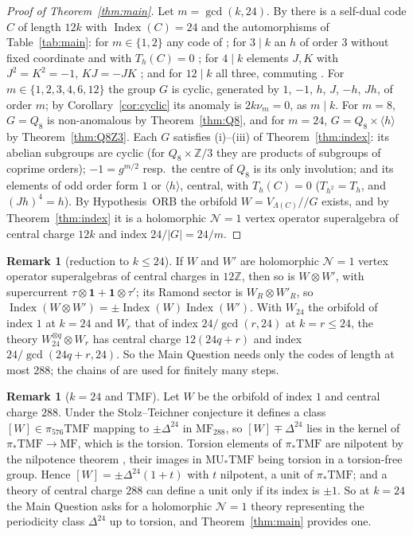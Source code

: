 \documentclass[11pt]{amsart}
\theoremstyle{definition}
\newtheorem{remark}[theorem]{Remark}
\newcommand{\Z}{\mathbb{Z}}
\newcommand{\cN}{\mathcal N}
\newcommand{\Index}{\operatorname{Index}}
\newcommand{\orb}{/\!\!/}
\begin{document}
\begin{proof}[Proof of Theorem~\ref{thm:main}]
Let $m=\gcd(k,24)$. By \cite[Thms.~B, C]{I} there is a self-dual code $C$ of length $12k$ with
$\Index(C)=24$ and the automorphisms of Table~\ref{tab:main}: for $m\in\{1,2\}$ any code of
\cite[Thm.~B]{I}; for $3\mid k$ an $h$ of order $3$ without fixed coordinate and with $T_h(C)=0$
\cite[Thm.~C(a)]{I}; for $4\mid k$ elements $J,K$ with $J^2=K^2=-1$, $KJ=-JK$ \cite[Thm.~C(b)]{I}; and
for $12\mid k$ all three, commuting \cite[Thm.~C(c)]{I}. For $m\in\{1,2,3,4,6,12\}$ the group $G$ is cyclic,
generated by $1$, $-1$, $h$, $J$, $-h$, $Jh$, of order $m$; by Corollary~\ref{cor:cyclic} its anomaly is
$2k\nu_m=0$, as $m\mid k$. For $m=8$, $G=Q_8$ is non-anomalous by Theorem~\ref{thm:Q8}, and for $m=24$,
$G=Q_8\times\langle h\rangle$ by Theorem~\ref{thm:Q8Z3}. Each $G$ satisfies (i)--(iii) of
Theorem~\ref{thm:index}: its abelian subgroups are cyclic (for $Q_8\times\Z/3$ they are products of
subgroups of coprime orders); $-1=g^{m/2}$ resp.\ the centre of $Q_8$ is its only involution; and its
elements of odd order form $1$ or $\langle h\rangle$, central, with $T_h(C)=0$ ($T_{h^2}=T_h$, and
$(Jh)^4=h$). By Hypothesis~ORB the orbifold $W=V_{\Lambda(C)}\orb G$ exists, and by
Theorem~\ref{thm:index} it is a holomorphic $\cN=1$ vertex operator superalgebra of central charge
$12k$ and index $24/|G|=24/m$.
\end{proof}

\begin{remark}[reduction to $k\le24$]\label{rem:reduction}
If $W$ and $W'$ are holomorphic $\cN=1$ vertex operator superalgebras of central charges in $12\Z$, then
so is $W\otimes W'$, with supercurrent $\tau\otimes\mathbf 1+\mathbf 1\otimes\tau'$; its Ramond sector is
$W_R\otimes W'_R$, so $\Index(W\otimes W')=\pm\Index(W)\Index(W')$. With $W_{24}$ the orbifold of index $1$
at $k=24$ and $W_r$ that of index $24/\gcd(r,24)$ at $k=r\le24$, the theory $W_{24}^{\otimes q}\otimes W_r$
has central charge $12(24q+r)$ and index $24/\gcd(24q+r,24)$. So the Main Question needs only the codes
of length at most $288$; the chains of \cite{I} are used for finitely many steps.
\end{remark}

\begin{remark}[$k=24$ and TMF]\label{rem:TMF}
Let $W$ be the orbifold of index $1$ and central charge $288$. Under the Stolz--Teichner conjecture
\cite[Conj.~5.4]{GJF} it defines a class $[W]\in\pi_{576}\mathrm{TMF}$ mapping to $\pm\Delta^{24}$ in
$\mathrm{MF}_{288}$, so $[W]\mp\Delta^{24}$ lies in the kernel of $\pi_*\mathrm{TMF}\to\mathrm{MF}$, which
is the torsion. Torsion elements of $\pi_*\mathrm{TMF}$ are nilpotent by the nilpotence theorem \cite{DHS},
their images in $\mathrm{MU}_*\mathrm{TMF}$ being torsion in a torsion-free group. Hence
$[W]=\pm\Delta^{24}(1+t)$ with $t$ nilpotent, a unit of $\pi_*\mathrm{TMF}$; and a theory of central
charge $288$ can define a unit only if its index is $\pm1$. So at $k=24$ the Main Question asks for a
holomorphic $\cN=1$ theory representing the periodicity class $\Delta^{24}$ up to torsion, and
Theorem~\ref{thm:main} provides one.
\end{remark}
\end{document}
